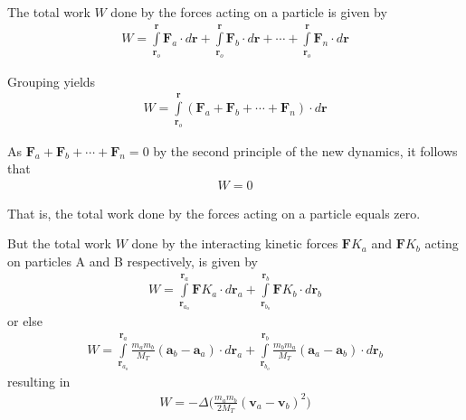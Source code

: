 \documentclass[12pt]{article}
\newcommand{\yN}{\newpage}%
\newcommand{\vA}{\mathbf{a}}
\newcommand{\vF}{\mathbf{F}}
\newcommand{\vR}{\mathbf{r}}
\newcommand{\vV}{\mathbf{v}}
\newcommand{\nK}{{\scriptstyle K}}
\newcommand{\mM}{m}
\newcommand{\mN}{M}
\newcommand{\mW}{W}
\newcommand{\rT}{_T}
\newcommand{\ra}{_a}
\newcommand{\rb}{_b}
\newcommand{\rn}{_n}
\newcommand{\ro}{_o}
\newcommand{\rao}{_{a_o}}
\newcommand{\rbo}{_{b_o}}
\begin{document}
\par The total work $\mW$ done by the forces acting on a particle is given by
\begin{eqnarray*}
\mW = \int\limits_{\vR\ro}^{\vR}{\vF\ra \cdot d\vR} + \int\limits_{\vR\ro}^{\vR}{\vF\rb \cdot d\vR} + \cdots + \int\limits_{\vR\ro}^{\vR}{\vF\rn \cdot d\vR}
\end{eqnarray*}
\par Grouping yields
\begin{eqnarray*}
\mW = \int\limits_{\vR\ro}^{\vR}{(\vF\ra + \vF\rb + \cdots + \vF\rn) \cdot d\vR}
\end{eqnarray*}
\par As $\vF\ra + \vF\rb + \cdots + \vF\rn = 0$ by the second principle of the new dynamics, it follows that
\begin{eqnarray*}
\mW = 0
\end{eqnarray*}
\par That is, the total work done by the forces acting on a particle equals zero.
\par But the total work $\mW$ done by the interacting kinetic forces $\vF\nK\ra$ and $\vF\nK\rb$ acting on particles A and B respectively, is given by
\begin{eqnarray*}
\mW = \int\limits_{\vR\rao}^{\vR\ra}{\vF\nK\ra \cdot d\vR\ra} + \int\limits_{\vR\rbo}^{\vR\rb}{\vF\nK\rb \cdot d\vR\rb}
\end{eqnarray*}
\noindent or else
\begin{eqnarray*}
\mW = \int\limits_{\vR\rao}^{\vR\ra}{\frac{\mM\ra\mM\rb}{\mN\rT}(\vA\rb - \vA\ra) \cdot d\vR\ra} + \int\limits_{\vR\rbo}^{\vR\rb}{\frac{\mM\rb\mM\ra}{\mN\rT}(\vA\ra - \vA\rb) \cdot d\vR\rb}
\end{eqnarray*}
\noindent resulting in
\begin{eqnarray*}
\mW = -\Delta \Bigg(\frac{\mM\ra\mM\rb}{2\mN\rT}(\vV\ra - \vV\rb)^2\Bigg)
\end{eqnarray*}

\yN \baselineskip=14.5pt \enlargethispage{0em}
\end{document}

